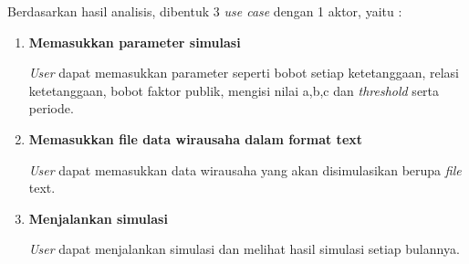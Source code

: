 Berdasarkan hasil analisis, dibentuk 3 \textit{use case} dengan 1 aktor, yaitu :
\begin{enumerate}
	\item \textbf{Memasukkan parameter simulasi}
	
	\textit{User} dapat memasukkan parameter seperti bobot setiap ketetanggaan, relasi ketetanggaan, bobot faktor publik, mengisi nilai a,b,c dan \textit{threshold} serta periode.
	\item \textbf{Memasukkan file data wirausaha dalam format text}
	
	\textit{User} dapat memasukkan data wirausaha yang akan disimulasikan berupa \textit{file} text.
	\item \textbf{Menjalankan simulasi}
	
	\textit{User} dapat menjalankan simulasi dan melihat hasil simulasi setiap bulannya.
\end{enumerate}

